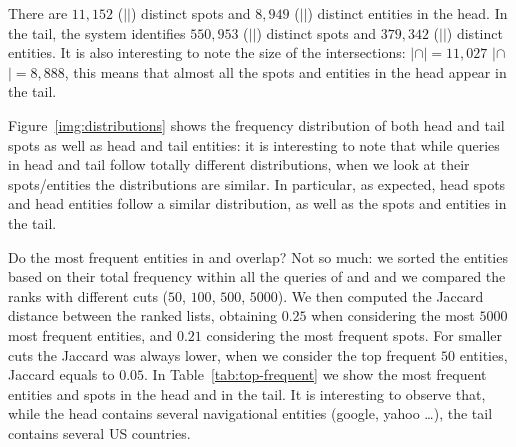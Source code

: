 There are $11,152$ ($|$\shead{}$|$)  distinct spots and $8,949$ ($|$\ehead{}$|$) distinct 
entities in the head. In the tail, the system identifies $550,953$ ($|$\stail{}$|$) distinct spots and 
$379,342$ ($|$\etail{}$|$) distinct entities. It  is also interesting to note the size of the 
intersections: \mbox{$|$\shead{}$\cap$\stail{}$|=11,027$}  $|$\ehead{}$\cap$\etail{}$| = 8,888$,
this means that almost all the spots and entities in the head appear in the tail. 

Figure~\ref{img:distributions} shows the frequency distribution of both head and tail spots as well as head and tail entities:
it is interesting to note that while queries in head and tail follow totally different distributions, when we look at their 
spots/entities the distributions are similar. In particular, as expected, head spots and head entities 
follow a similar distribution, as well as the spots and entities in the tail. 

Do the most frequent entities in \ehead{} and \etail{} overlap? Not so much: we sorted the entities
based on their total frequency within all the queries of \head{} and \tail{} and we compared
the ranks with different cuts ($50$, $100$, $500$, $5000$). We then computed the Jaccard distance
between the ranked lists, obtaining $0.25$ when considering the most $5000$ most frequent entities,
and $0.21$ considering the most frequent spots. For smaller cuts the Jaccard was always lower, 
when we consider the top frequent $50$ entities, Jaccard equals to $0.05$. In Table~\ref{tab:top-frequent}
we show the most frequent entities and spots in the head and in the tail. It is interesting to 
observe that, while the head contains several navigational entities (google, yahoo \dots), the 
tail contains several US countries.










